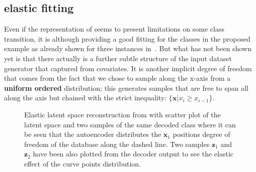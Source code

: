 \subsection{elastic fitting}
Even if the representation of  seems to present limitations on some class transition, it is although providing a good fitting for the classes in the proposed example as already shown for three instances in~\Figure{\ref{fig:step_1}}. But what has not been shown yet is that there actually is a further subtle structure of the input dataset generator that  captured from covariates. It is another implicit degree of freedom that comes from the fact that we chose to sample along the x-axis from a \textbf{uniform ordered} distribution; this generates samples that are free to span all along the axis but chained with the strict inequality: $\{\bm{x} | x_{i} \geqslant x_{i-1}\}$.
\begin{figure}
    \centering
    \caption{Elastic latent space reconstruction from  with scatter plot of the latent space and two samples of the same decoded class where it can be seen that the autoencoder distributes the $\bm{x}_1$ positions degree of freedom of the database along the dashed line. Two samples $\bm{z}_1$ and $\bm{z}_2$ have been also plotted from the decoder output to see the elastic effect of the curve points distribution. } 
    \label{fig:step1_elastic}
\end{figure}
